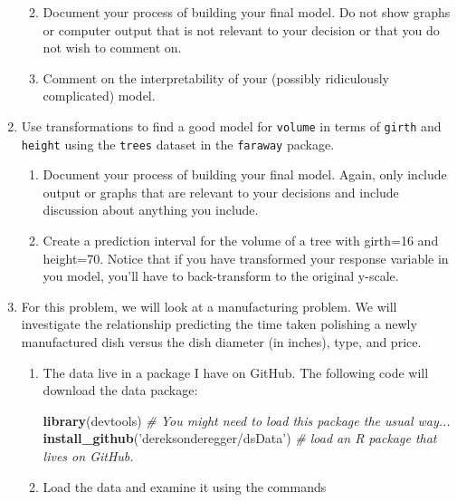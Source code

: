 \documentclass[]{book}
\newenvironment{Shaded}{\begin{snugshade}}{\end{snugshade}}
\newcommand{\KeywordTok}[1]{\textcolor[rgb]{0.13,0.29,0.53}{\textbf{{#1}}}}
\newcommand{\StringTok}[1]{\textcolor[rgb]{0.31,0.60,0.02}{{#1}}}
\newcommand{\CommentTok}[1]{\textcolor[rgb]{0.56,0.35,0.01}{\textit{{#1}}}}
\newcommand{\NormalTok}[1]{{#1}}
\theoremstyle{definition}
\theoremstyle{definition}
\theoremstyle{remark}
\begin{document}
\begin{enumerate}
  \begin{enumerate}
  \def\labelenumii{\alph{enumii}.}
  \item
    Document your process of building your final model. Do not show
    graphs or computer output that is not relevant to your decision or
    that you do not wish to comment on.
  \item
    Comment on the interpretability of your (possibly ridiculously
    complicated) model.
  \end{enumerate}
\item
  Use transformations to find a good model for \texttt{volume} in terms
  of \texttt{girth} and \texttt{height} using the \texttt{trees} dataset
  in the \texttt{faraway} package.

  \begin{enumerate}
  \def\labelenumii{\alph{enumii}.}
  \item
    Document your process of building your final model. Again, only
    include output or graphs that are relevant to your decisions and
    include discussion about anything you include.
  \item
    Create a prediction interval for the volume of a tree with girth=16
    and height=70. Notice that if you have transformed your response
    variable in you model, you'll have to back-transform to the original
    y-scale.
  \end{enumerate}
\item
  For this problem, we will look at a manufacturing problem. We will
  investigate the relationship predicting the time taken polishing a
  newly manufactured dish versus the dish diameter (in inches), type,
  and price.

  \begin{enumerate}
  \def\labelenumii{\alph{enumii}.}
  \item
    The data live in a package I have on GitHub. The following code will
    download the data package:

\begin{Shaded}
\begin{Highlighting}[]
\KeywordTok{library}\NormalTok{(devtools)   }\CommentTok{# You might need to load this package the usual way...}
\KeywordTok{install_github}\NormalTok{(}\StringTok{'dereksonderegger/dsData'}\NormalTok{) }\CommentTok{# load an R package that lives on GitHub.}
\end{Highlighting}
\end{Shaded}
  \item
    Load the data and examine it using the commands


\end{enumerate}
\end{enumerate}
\end{document}
